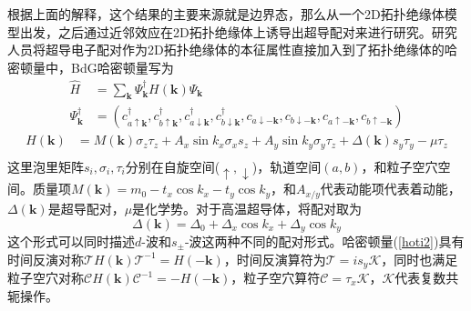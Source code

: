  根据上面的解释，这个结果的主要来源就是边界态，那么从一个2D拓扑绝缘体模型出发，之后通过近邻效应在2D拓扑绝缘体上诱导出超导配对来进行研究。研究人员将超导电子配对作为2D拓扑绝缘体的本征属性直接加入到了拓扑绝缘体的哈密顿量中，BdG哈密顿量写为
\begin{equation}
\begin{aligned}
\hat{H}&=\sum_\mathbf{k}\Psi_\mathbf{k}^\dagger H(\mathbf{k})\Psi_\mathbf{k}\\
\Psi^\dagger_\mathbf{k}&=(c^\dagger_{a\uparrow\mathbf{k}},c^\dagger_{b\uparrow\mathbf{k}},c^\dagger_{a\downarrow\mathbf{k}},c^\dagger_{b\downarrow\mathbf{k}},c_{a\downarrow\mathbf{-k}},c_{b\downarrow\mathbf{-k}},c_{a\uparrow\mathbf{-k}},c_{b\uparrow\mathbf{-k}})
\end{aligned}
\end{equation}
\begin{equation}
\begin{aligned}
H(\mathbf{k})&=M(\mathbf{k})\sigma_z\tau_z+A_x\sin k_x\sigma_xs_z+A_y\sin k_y\sigma_y\tau_z+\Delta(\mathbf{k})s_y\tau_y-\mu\tau_z\\\label{hoti2}
\end{aligned}
\end{equation}
这里泡里矩阵$s_i,\sigma_i,\tau_i$分别在自旋空间($\uparrow,\downarrow$)，轨道空间$(a,b)$，和粒子空穴空间。质量项$M(\mathbf{k})=m_0-t_x\cos k_x-t_y\cos k_y$，和$A_{x/y}$代表动能项代表着动能，$\Delta(\mathbf{k})$是超导配对，$\mu$是化学势。对于高温超导体，将配对取为
\begin{equation}
\Delta(\mathbf{k})=\Delta_0+\Delta_x\cos k_x+\Delta_y\cos k_y
\end{equation}
这个形式可以同时描述$d$-波和$s_\pm$-波这两种不同的配对形式。哈密顿量(\ref{hoti2})具有时间反演对称$\mathcal{T}H(\mathbf{k})\mathcal{T}^{-1}=H(-\mathbf{k})$，时间反演算符为$\mathcal{T}=is_y\mathcal{K}$，同时也满足粒子空穴对称$\mathcal{C}H(\mathbf{k})\mathcal{C}^{-1}=-H(-\mathbf{k})$，粒子空穴算符$\mathcal{C}=\tau_x\mathcal{K}$，$\mathcal{K}$代表复数共轭操作。

